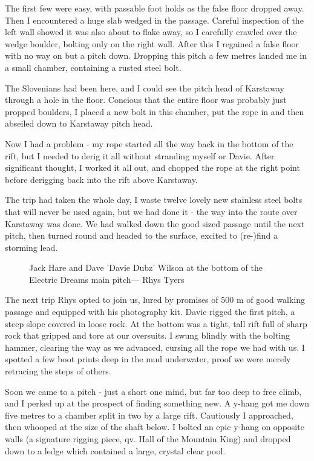 The first few were easy, with passable foot holds as the false floor dropped away. Then I encountered a huge slab wedged in the passage. Careful inspection of the left wall showed it was also about to flake away, so I carefully crawled over the wedge boulder, bolting only on the right wall. After this I regained a false floor with no way on but a pitch down. Dropping this pitch a few metres landed me in a small chamber, containing a rusted steel bolt.

The Slovenians had been here, and I could see the pitch head of Karstaway through a hole in the floor. Concious that the entire floor was probably just propped boulders, I placed a new bolt in this chamber, put the rope in and then abseiled down to Karstaway pitch head.

Now I had a problem - my rope started all the way back in the bottom of the rift, but I needed to derig it all without stranding myself or Davie. After significant thought, I worked it all out, and chopped the rope at the right point before derigging back into the rift above Karstaway. 

The trip had taken the whole day, I waste twelve lovely new stainless steel bolts that will never be used again, but we had done it - the way into the route over Karstaway was done. We had walked down the good sized passage until the next pitch, then turned round and headed to the surface, excited to (re-)find a storming lead.

\begin{figure}[t!]
\checkoddpage \ifoddpage \forcerectofloat \else \forceversofloat \fi
\centering
{}
\caption{Jack Hare and Dave 'Davie Dubz' Wilson at the bottom of the Electric Dreams main pitch--- Rhys Tyers}
\label{Elecdreams}
\end{figure}




The next trip Rhys opted to join us, lured by promises of 500 m of good walking passage and equipped with his photography kit. Davie rigged the first pitch, a steep slope covered in loose rock. At the bottom was a tight, tall rift full of sharp rock that gripped and tore at our oversuits. I swung blindly with the bolting hammer, clearing the way as we advanced, cursing all the rope we had with us. I spotted a few boot prints deep in the mud underwater, proof we were merely retracing the steps of others.



Soon we came to a pitch - just a short one mind, but far too deep to free climb, and I perked up at the prospect of finding something new. A y-hang got me down five metres to a chamber split in two by a large rift. Cautiously I approached, then whooped at the size of the shaft below. I bolted an epic y-hang on opposite walls (a signature rigging piece, qv. Hall of the Mountain King) and dropped down to a ledge which contained a large, crystal clear pool.


